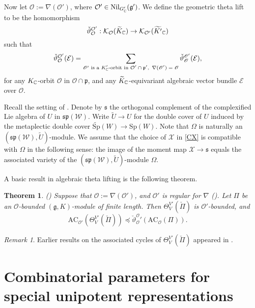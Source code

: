 \documentclass[lang = american]{ems-icm} %
\def\Sp{{\mathrm{Sp}}}
\newcommand{\g}{\mathfrak g}
\newcommand{\p}{\mathfrak p}
\newcommand{\s}{\mathfrak s}
\newcommand{\CE}{{\mathcal {E}}}
\newcommand{\CK}{{\mathcal {K}}}
\newcommand{\CO}{{\mathcal {O}}}
\newcommand{\CW}{{\mathcal {W}}}
\newcommand{\CX}{{\mathcal {X}}}
\newcommand{\cO}{\mathcal{O}}
\newcommand{\sO}{\mathscr{O}}
\numberwithin{equation}{section}
\newtheorem{thm}{Theorem}[section]
\theoremstyle{remark}
\newtheorem*{remark}{Remark}
\begin{document}
Now let $\CO:= \nabla(\CO')$, where $\CO'\in \mathrm{Nil}_{G'_{\C}}(\g')$. We define the geometric theta lift to be the homomorphism
\[
 \check \vartheta_{\CO}^{\CO'}: \CK_{\CO}(\widetilde{K}_{\C})\rightarrow \CK_{\CO'}(\widetilde{K'}_{\C})
\]
such that
\[
 \check \vartheta_{\CO}^{\CO'}(\CE)= \sum_{\sO'\textrm{ is a $K'_{\C} $-orbit in $\CO'\cap \p'$,  $\, \nabla (\sO')=\sO$}}    \check \vartheta_{\sO}^{\sO'}(\CE),
\]
for any $K_{\mathbb{C}} $-orbit $\sO $ in $\CO\cap \p$, and any $\widetilde{K}_{\mathbb{C}}$-equivariant algebraic vector bundle $\CE$ over $\sO$.


Recall the setting of . Denote by $\s$ the orthogonal complement of the complexified Lie algebra of $U$ in $\mathfrak s\p(\CW)$.  Write $ \widetilde U\rightarrow U$ for the double cover of $U$ induced by the metaplectic double cover $\widetilde \Sp(W)\rightarrow \Sp(W)$. Note that $\Omega$ is naturally an $(\mathfrak s\p(\CW), \widetilde U)$-module.
We assume that the choice of $\CX$ in \eqref{CX} is compatible with $\Omega$ in the following sense: the image of the moment map $\CX\rightarrow \s$ equals the associated variety of the $(\mathfrak {sp}(\CW), \widetilde U)$-module $\Omega$.


A basic result in algebraic theta lifting is the following theorem.

\begin{thm}\emph{(\cite{BMSZ3})}
\label{GDS.AC}
Suppose that $\CO:= \nabla(\CO')$, and $\CO'$ is regular for $\nabla $ (\cite[Definition 7.6]{BMSZ3}).
Let $\Pi$ be an $\CO$-bounded $(\g, K)$-module of finite length. Then  $\Theta_V^{V'}(\check \Pi)$ is $\CO'$-bounded, and
    \[
    \mathrm{AC}_{\cO'}(\Theta_V^{V'}(\check \Pi))\preceq \check \vartheta_{\cO}^\cO'(\mathrm{AC}_{\cO}(\Pi)).
  \]
\end{thm}

\begin{remark} Earlier results on the associated cycles of $\Theta_V^{V'}(\check \Pi)$ appeared in \cites{NOTYK,NZ,LM}.
\end{remark}

\section{Combinatorial parameters for special unipotent representations}\label{sec4}
\end{document}

